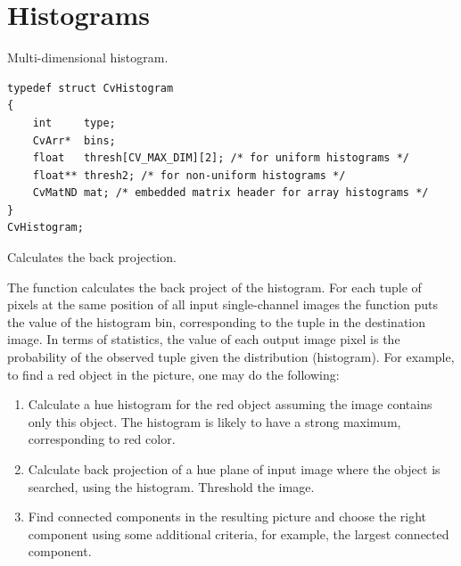\section{Histograms}

\ifCPy

\ifC
{}\label{CvHistogram}
Multi-dimensional histogram.

\begin{lstlisting}
typedef struct CvHistogram
{
    int     type;
    CvArr*  bins;
    float   thresh[CV_MAX_DIM][2]; /* for uniform histograms */
    float** thresh2; /* for non-uniform histograms */
    CvMatND mat; /* embedded matrix header for array histograms */
}
CvHistogram;
\end{lstlisting}
\fi

Calculates the back projection.


\begin{description}
\end{description}

The function calculates the back project of the histogram. For each tuple of pixels at the same position of all input single-channel images the function puts the value of the histogram bin, corresponding to the tuple in the destination image. In terms of statistics, the value of each output image pixel is the probability of the observed tuple given the distribution (histogram). For example, to find a red object in the picture, one may do the following:

\begin{enumerate}
 \item Calculate a hue histogram for the red object assuming the image contains only this object. The histogram is likely to have a strong maximum, corresponding to red color.
 \item Calculate back projection of a hue plane of input image where the object is searched, using the histogram. Threshold the image.
 \item Find connected components in the resulting picture and choose the right component using some additional criteria, for example, the largest connected component.
\end{enumerate}

